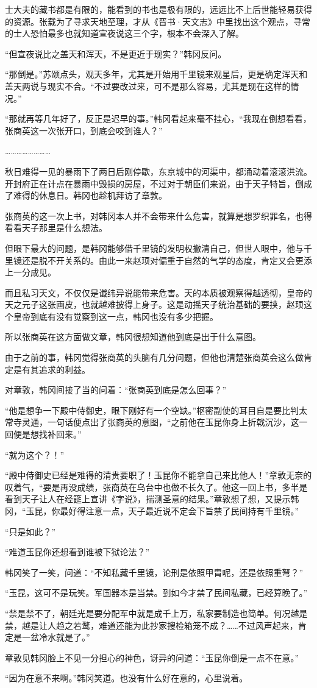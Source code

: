 士大夫的藏书都是有限的，能看到的书也是极有限的，远远比不上后世能轻易获得的资源。张载为了寻求天地至理，才从《晋书·天文志》中里找出这个观点，寻常的士人恐怕最多也就知道宣夜说这三个字，根本不会深入了解。

“但宣夜说比之盖天和浑天，不是更近于现实？”韩冈反问。

“那倒是。”苏颂点头，观天多年，尤其是开始用千里镜来观星后，更是确定浑天和盖天两说与现实不合。“不过要改过来，可不是那么容易，尤其是现在这样的情况。”

“那就再等几年好了，反正是迟早的事。”韩冈看起来毫不挂心，“我现在倒想看看，张商英这一次张开口，到底会咬到谁人？”

……………………

秋日难得一见的暴雨下了两日后刚停歇，东京城中的河渠中，都涌动着滚滚洪流。开封府正在计点在暴雨中毁损的房屋，不过对于朝臣们来说，由于天子特旨，倒成了难得的休息日。韩冈也趁机拜访了章敦。

张商英的这一次上书，对韩冈本人并不会带来什么危害，就算是想罗织罪名，也得看看天子那里是什么想法。

但眼下最大的问题，是韩冈能够借千里镜的发明权撇清自己，但世人眼中，他与千里镜还是脱不开关系的。由此一来赵顼对偏重于自然的气学的态度，肯定又会更添上一分成见。

而且私习天文，不仅仅是谶纬异说能带来危害。天的本质被观察得越透彻，皇帝的天之元子这张画皮，也就越难披得上身子。这是动摇天子统治基础的要挟，赵顼这个皇帝到底有没有觉察到这一点，韩冈也没有多少把握。

所以张商英在这方面做文章，韩冈很想知道他到底是出于什么意图。

由于之前的事，韩冈觉得张商英的头脑有几分问题，但他也清楚张商英会这么做肯定是有其追求的利益。

对章敦，韩冈间接了当的问着：“张商英到底是怎么回事？”

“他是想争一下殿中侍御史，眼下刚好有一个空缺。”枢密副使的耳目自是要比判太常寺灵通，一句话便点出了张商英的意图，“之前他在玉昆你身上折戟沉沙，这一回便是想找补回来。”

“就为这个？！”

“殿中侍御史已经是难得的清贵要职了！玉昆你不能拿自己来比他人！”章敦无奈的叹着气，“要是再没成绩，张商英在乌台中也做不长久了。他这一回上书，多半是看到天子让人在经筵上宣讲《字说》，揣测圣意的结果。”章敦想了想，又提示韩冈，“玉昆，你最好得注意一点，天子最近说不定会下旨禁了民间持有千里镜。”

“只是如此？”

“难道玉昆你还想看到谁被下狱论法？”

韩冈笑了一笑，问道：“不知私藏千里镜，论刑是依照甲胄呢，还是依照重弩？”

“玉昆，这可不是玩笑。军国器本是当禁。到如今才禁了民间私藏，已经算晚了。”

“禁是禁不了，朝廷光是要分配军中就是成千上万，私家要制造也简单。何况越是禁，越是让人趋之若鹜，难道还能为此抄家搜检箱笼不成？……不过风声起来，肯定是一盆冷水就是了。”

章敦见韩冈脸上不见一分担心的神色，讶异的问道：“玉昆你倒是一点不在意。”

“因为在意不来啊。”韩冈笑道。也没有什么好在意的，心里说着。


